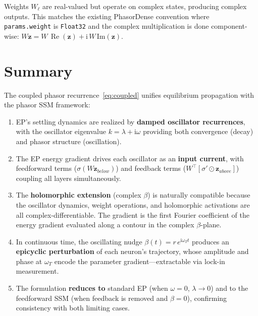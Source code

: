 \documentclass[11pt]{article}
\newcommand{\im}{\mathrm{i}}
\theoremstyle{definition}
\DeclareMathOperator{\Real}{Re}
\begin{document}
Weights $W_\ell$ are real-valued but operate on complex states,
producing complex outputs.  This matches the existing PhasorDense
convention where \texttt{params.weight} is \texttt{Float32} and the
complex multiplication is done component-wise:
$W\bm{z} = W\,\Real(\bm{z}) + \im\,W\,\text{Im}(\bm{z})$.

\section{Summary}\label{sec:summary}

The coupled phasor recurrence~\eqref{eq:coupled} unifies equilibrium
propagation with the phasor SSM framework:

\begin{enumerate}
\item EP's settling dynamics are realized by \textbf{damped oscillator
  recurrences}, with the oscillator eigenvalue $k=\lambda+\im\omega$
  providing both convergence (decay) and phasor structure (oscillation).

\item The EP energy gradient drives each oscillator as an
  \textbf{input current}, with feedforward terms ($\sigma(W\bm{z}_{below})$)
  and feedback terms ($W^{\!\top}[\sigma'\odot\bm{z}_{above}]$)
  coupling all layers simultaneously.

\item The \textbf{holomorphic extension} (complex $\beta$) is naturally
  compatible because the oscillator dynamics, weight operations, and
  holomorphic activations are all complex-differentiable.  The gradient
  is the first Fourier coefficient of the energy gradient evaluated
  along a contour in the complex $\beta$-plane.

\item In continuous time, the oscillating nudge
  $\beta(t)=r\,e^{\im\omega_T t}$ produces an \textbf{epicyclic
  perturbation} of each neuron's trajectory, whose amplitude and phase
  at $\omega_T$ encode the parameter gradient---extractable via lock-in
  measurement.

\item The formulation \textbf{reduces to} standard EP (when
  $\omega=0$, $\lambda\to 0$) and to the feedforward SSM (when feedback
  is removed and $\beta=0$), confirming consistency with both limiting
  cases.
\end{enumerate}
\end{document}
